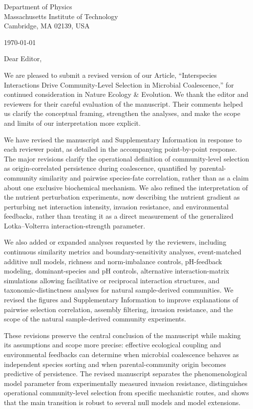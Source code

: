 \documentclass[11pt]{article}
\begin{document}
Department of Physics\\
Massachusetts Institute of Technology\\
Cambridge, MA 02139, USA

\today

Dear Editor,

We are pleased to submit a revised version of our Article, ``Interspecies Interactions Drive Community-Level Selection in Microbial Coalescence,'' for continued consideration in Nature Ecology \& Evolution. We thank the editor and reviewers for their careful evaluation of the manuscript. Their comments helped us clarify the conceptual framing, strengthen the analyses, and make the scope and limits of our interpretation more explicit.

We have revised the manuscript and Supplementary Information in response to each reviewer point, as detailed in the accompanying point-by-point response. The major revisions clarify the operational definition of community-level selection as origin-correlated persistence during coalescence, quantified by parental-community similarity and pairwise species-fate correlation, rather than as a claim about one exclusive biochemical mechanism. We also refined the interpretation of the nutrient perturbation experiments, now describing the nutrient gradient as perturbing net interaction intensity, invasion resistance, and environmental feedbacks, rather than treating it as a direct measurement of the generalized Lotka--Volterra interaction-strength parameter.

We also added or expanded analyses requested by the reviewers, including continuous similarity metrics and boundary-sensitivity analyses, event-matched additive null models, richness and norm-imbalance controls, pH-feedback modeling, dominant-species and pH controls, alternative interaction-matrix simulations allowing facilitative or reciprocal interaction structures, and taxonomic-distinctness analyses for natural sample-derived communities. We revised the figures and Supplementary Information to improve explanations of pairwise selection correlation, assembly filtering, invasion resistance, and the scope of the natural sample-derived community experiments.

These revisions preserve the central conclusion of the manuscript while making its assumptions and scope more precise: effective ecological coupling and environmental feedbacks can determine when microbial coalescence behaves as independent species sorting and when parental-community origin becomes predictive of persistence. The revised manuscript separates the phenomenological model parameter from experimentally measured invasion resistance, distinguishes operational community-level selection from specific mechanistic routes, and shows that the main transition is robust to several null models and model extensions.
\end{document}
